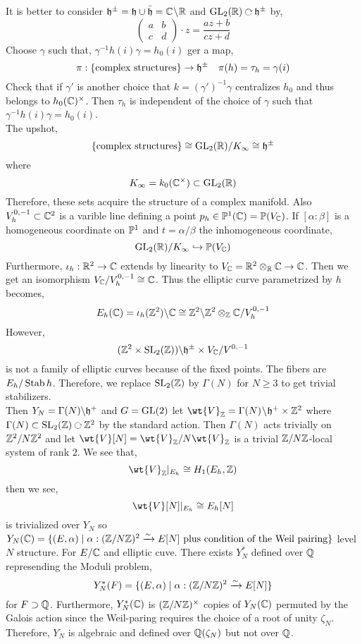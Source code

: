 \documentclass[12pt]{article}
\newcommand{\bs}{\backslash}
\begin{document}
It is better to consider $\h^{\pm} = \h \cup \bar{\h} = \CC \sm \RR$ and $\GL_2(\RR) \acts \h^{\pm}$ by,
\[ \begin{pmatrix}
a & b
\\
c & d
\end{pmatrix}
\cdot z = \frac{az + b}{cz + d} \]
Choose $\gamma$ such that, $\gamma^{-1} h(i) \gamma = h_0(i)$ ger a map,
\[ \pi : \{ \text{complex structures} \} \to \h^{\pm} \quad \pi(h) = \tau_h = \gamma(i) \]
Check that if $\gamma'$ is another choice that $k = (\gamma')^{-1} \gamma$ centralizes $h_0$ and thus belongs to $h_0(\CC)^\times$. Then $\tau_h$ is independent of the choice of $\gamma$ such that $\gamma^{-1} h(i) \gamma = h_0(i)$.
\bigskip\\
The upshot,
\[ \{ \text{complex structures} \} \cong \GL_2(\RR) / K_\infty \cong \h^\pm \]
where
\[ K_\infty = k_0(\CC^\times) \subset \GL_2(\RR) \]
Therefore, these sets acquire the structure of a complex manifold. Also $V_h^{0,-1} \subset \CC^2$ is a varible line defining a point $p_h \in \P^1(\CC) = \P(V_\CC)$. If $[\alpha : \beta]$ is a homogeneous coordinate on $\P^1$ and $t = \alpha / \beta$ the inhomogeneous coordinate,
\[ \GL_2(\RR) / K_\infty \embed \P(V_{\CC}) \]
Furthermore, $\iota_h : \RR^2 \to \CC$ extends by linearity to $V_{\CC} = \RR^2 \ot_{\RR} \CC \to \CC$. Then we get an isomorphism $V_{\CC} / V_h^{0,-1} \cong \CC$. Thus the elliptic curve parametrized by $h$ becomes,
\[ E_h(\CC) = \iota_h(\Z^2) \backslash \CC \cong \Z^2 \backslash \Z^2 \ot_{\Z} \CC / V_h^{0, -1} \]
However, 
\[ (\Z^2 \times \SL_2(\Z)) \backslash \h^{\pm} \times V_{\CC} / V^{0,-1} \]
is not a family of elliptic curves because of the fixed points. The fibers are $E_h / \Stab{h}$. Therefore, we replace $\SL_2(\Z)$ by $\Gamma(N)$ for $N \ge 3$ to get trivial stabilizers. 
\bigskip\\
Then $Y_N = \Gamma(N) \bs \h^+$ and $G = \GL(2)$ let $\wt{V}_\Z = \Gamma(N) \sm \h^+ \times \Z^2$ where $\Gamma(N) \subset \SL_2(\Z) \acts \Z^2$ by the standard action. Then $\Gamma(N)$ acts trivially on $\Z^2 / N \Z^2$ and let $\wt{V}[N] = \wt{V}_{\Z} / N \wt{V}_{\Z}$ is a trivial $\Z / N \Z$-local system of rank $2$. We see that,
\[ \wt{V}_{\Z} |_{E_h} \cong H_1(E_h, \Z) \]
then we see, 
\[ \wt{V}[N]|_{E_h} \cong E_h[N] \]
is trivialized over $Y_N$ so $Y_N(\CC) = \{ (E, \alpha) \mid \alpha : (\Z / N \Z)^2 \iso E[N] \text{ plus condition of the Weil pairing} \}$ level $N$ structure. For $E / \CC$ and elliptic cuve. There exists $Y^*_N$ defined over $\Q$ represending the Moduli problem,
\[ Y^*_N(F) = \{ (E, \alpha) \mid \alpha : (\Z / N \Z)^2 \iso E[N] \} \]
for $F \supset \Q$. Furthermore, $Y_N^*(\CC)$ is $(\Z / N \Z)^\times$ copies of $Y_N(\CC)$ permuted by the Galois action since the Weil-paring requires the choice of a root of unity $\zeta_N$. Therefore, $Y_N$ is algebraic and defined over $\Q(\zeta_N)$ but not over $\Q$. 
\end{document}
